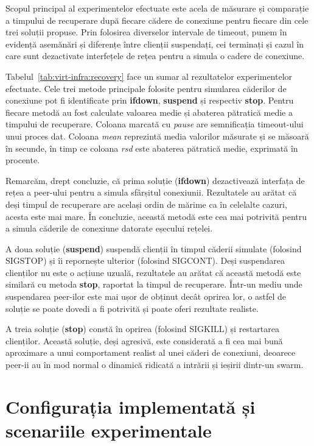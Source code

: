 Scopul principal al experimentelor efectuate este acela de măsurare și
comparație a timpului de recuperare după fiecare cădere de conexiune
pentru fiecare din cele trei soluții propuse. Prin folosirea diverselor
intervale de timeout, punem în evidență asemănări și diferențe între
clienții suspendați, cei terminați și cazul în care sunt dezactivate
interfețele de rețea pentru a simula o cadere de conexiune.



Tabelul~\ref{tab:virt-infra:recovery} face un sumar al rezultatelor
experimentelor efectuate. Cele trei metode principale folosite pentru
simularea căderilor de conexiune pot fi identificate prin \textbf{ifdown},
\textbf{suspend} și respectiv \textbf{stop}. Pentru fiecare metodă au
fost calculate valoarea medie și abaterea pătratică medie a timpului de 
recuperare. Coloana marcată cu \textit{pause} are semnificația timeout-ului
unui proces dat. Coloana \textit{mean} reprezintă media valorilor măsurate
și se măsoară în secunde, în timp ce coloana \textit{rsd} este abaterea
pătratică medie, exprimată în procente.

Remarcăm, drept concluzie, că prima soluție (\textbf{ifdown}) dezactivează
interfața de rețea a peer-ului pentru a simula sfârșitul conexiunii.
Rezultatele au arătat că deși timpul de recuperare are același ordin de
mărime ca în celelalte cazuri, acesta este mai mare. În concluzie, această
metodă este cea mai potrivită pentru a simula căderile de conexiune datorate
eșecului rețelei.

A doua soluție (\textbf{suspend}) suspendă clienții în timpul căderii
simulate (folosind SIGSTOP) și îi repornește ulterior (folosind SIGCONT).
Deși suspendarea clienților nu este o acțiune uzuală, rezultatele au arătat
că această metodă este similară cu metoda \textbf{stop}, raportat la timpul
de recuperare. Într-un mediu unde suspendarea peer-ilor este mai ușor de
obținut decât oprirea lor, o astfel de soluție se poate dovedi a fi
potrivită și poate oferi rezultate realiste.

A treia soluție (\textbf{stop}) constă în oprirea (folosind SIGKILL) și
restartarea clienților. Această soluție, deși agresivă, este
considerată a fi cea mai bună aproximare a unui comportament realist al
unei căderi de conexiuni, deoarece peer-ii au în mod normal o dinamică
ridicată a intrării și ieșirii dintr-un swarm.

\section{Configurația implementată și scenariile experimentale}
\label{sec:virt-infra:setup-scenarios}

